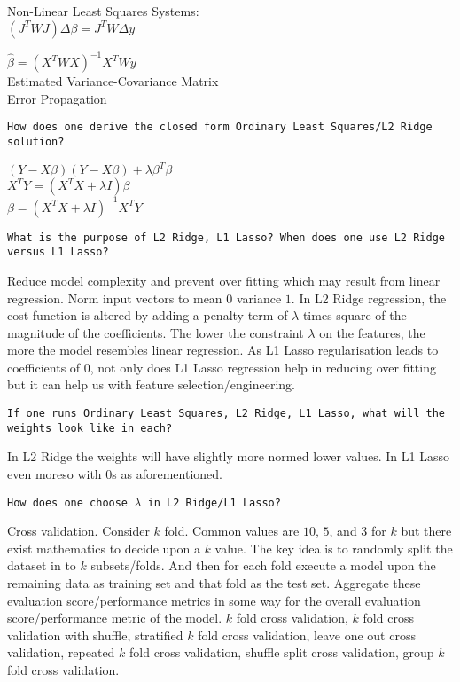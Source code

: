 Non-Linear Least Squares Systems: \\
$(J^T W J)\Delta \beta=J^T W \Delta y$

$\hat{\beta}=(X^T W X)^{-1} X^T W y$ \\
Estimated Variance-Covariance Matrix \\
Error Propagation

\texttt{How does one derive the closed form Ordinary Least Squares/L2 Ridge solution?}

$(Y-X \beta)(Y-X \beta)+\lambda \beta^T \beta$ \\
$X^T Y=(X^T X+\lambda I)\beta$ \\
$\beta=(X^T X+\lambda I)^{-1} X^T Y$

\texttt{What is the purpose of L2 Ridge, L1 Lasso? When does one use L2 Ridge versus L1 Lasso?}

Reduce model complexity and prevent over fitting which may result from linear regression. Norm input vectors to mean $0$ variance $1$. In L2 Ridge regression, the cost function is altered by adding a penalty term of $\lambda$ times square of the magnitude of the coefficients. The lower the constraint $\lambda$ on the features, the more the model resembles linear regression. As L1 Lasso regularisation leads to coefficients of $0$, not only does L1 Lasso regression help in reducing over fitting but it can help us with feature selection/engineering.

\texttt{If one runs Ordinary Least Squares, L2 Ridge, L1 Lasso, what will the weights look like in each?}

In L2 Ridge the weights will have slightly more normed lower values. In L1 Lasso even moreso with $0$s as aforementioned.

\texttt{How does one choose $\lambda$ in L2 Ridge/L1 Lasso?}

Cross validation. Consider $k$ fold. Common values are $10$, $5$, and $3$ for $k$ but there exist mathematics to decide upon a $k$ value. The key idea is to randomly split the dataset in to $k$ subsets/folds. And then for each fold execute a model upon the remaining data as training set and that fold as the test set. Aggregate these evaluation score/performance metrics in some way for the overall evaluation score/performance metric of the model. $k$ fold cross validation, $k$ fold cross validation with shuffle, stratified $k$ fold cross validation, leave one out cross validation, repeated $k$ fold cross validation, shuffle split cross validation, group $k$ fold cross validation.

